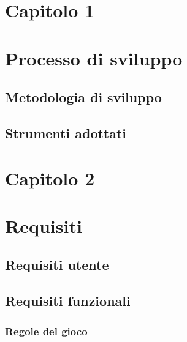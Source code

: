 \date{%
    \small{Paradigmi di Programmazione e Sviluppo}\\%
    \small{Anni accademici 2017--2018 e 2018--2019}
}




    \maketitle
    \clearpage
	\tableofcontents
	\clearpage
	\setcounter{figure}{0}
    \section*{\Huge {Capitolo 1}\label{chapter1}}
      \section{Processo di sviluppo}\label{sec:process}
        \subsection {Metodologia di sviluppo}\label{subsec:metodology}
        \subsection {Strumenti adottati}\label{subsec:tools}

        \clearpage

	\setcounter{figure}{0}
    \section*{\Huge {\textbf Capitolo 2}\label{chapter2}}
    \section{Requisiti}\label{sec:requirements}
         \subsection {Requisiti utente}\label{subsec:requirements:business}
             \subsection {Requisiti funzionali}\label{subsec:requirements:functional}
            \subsubsection[Gioco]{\large {Regole del gioco}\label{subsub:requirements:game}}
